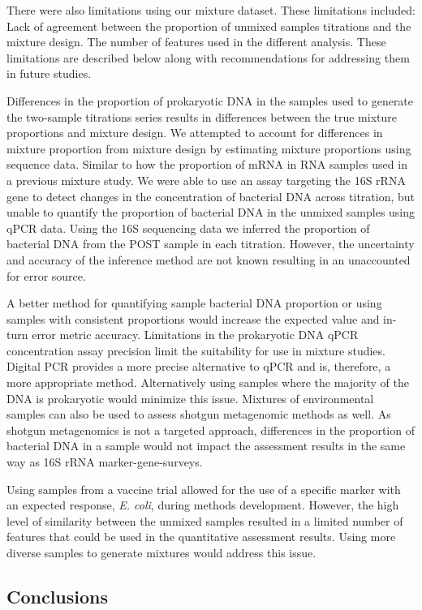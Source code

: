 \documentclass[smallextended]{svjour3}       %
\begin{document}
There were also limitations using our mixture dataset. These limitations
included: Lack of agreement between the proportion of unmixed samples
titrations and the mixture design. The number of features used in the
different analysis. These limitations are described below along with
recommendations for addressing them in future studies.

Differences in the proportion of prokaryotic DNA in the samples used to
generate the two-sample titrations series results in differences between
the true mixture proportions and mixture design. We attempted to account
for differences in mixture proportion from mixture design by estimating
mixture proportions using sequence data. Similar to how the proportion
of mRNA in RNA samples used in a previous mixture study. We were able to
use an assay targeting the 16S rRNA gene to detect changes in the
concentration of bacterial DNA across titration, but unable to quantify
the proportion of bacterial DNA in the unmixed samples using qPCR data.
Using the 16S sequencing data we inferred the proportion of bacterial
DNA from the POST sample in each titration. However, the uncertainty and
accuracy of the inference method are not known resulting in an
unaccounted for error source.

A better method for quantifying sample bacterial DNA proportion or using
samples with consistent proportions would increase the expected value
and in-turn error metric accuracy. Limitations in the prokaryotic DNA
qPCR concentration assay precision limit the suitability for use in
mixture studies. Digital PCR provides a more precise alternative to qPCR
and is, therefore, a more appropriate method. Alternatively using
samples where the majority of the DNA is prokaryotic would minimize this
issue. Mixtures of environmental samples can also be used to assess
shotgun metagenomic methods as well. As shotgun metagenomics is not a
targeted approach, differences in the proportion of bacterial DNA in a
sample would not impact the assessment results in the same way as 16S
rRNA marker-gene-surveys.

Using samples from a vaccine trial allowed for the use of a specific
marker with an expected response, \emph{E. coli}, during methods
development. However, the high level of similarity between the unmixed
samples resulted in a limited number of features that could be used in
the quantitative assessment results. Using more diverse samples to
generate mixtures would address this issue.

\hypertarget{conclusions}{%
\subsection{Conclusions}\label{conclusions}}
\end{document}
